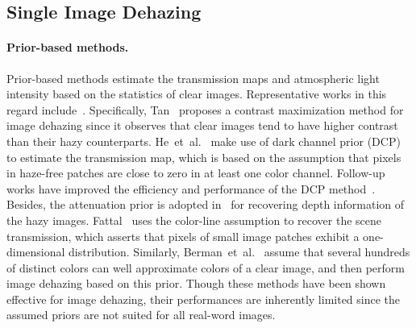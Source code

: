 \documentclass[10pt,twocolumn,letterpaper]{article}
\def\etal{et~al.\xspace}
\begin{document}
\subsection{Single Image Dehazing}
\paragraph{Prior-based methods.}
Prior-based methods estimate the transmission maps and atmospheric light intensity based on the statistics of clear images.
Representative works in this regard include~\cite{tan2008visibility,He2011Single,zhu2015fast,fattal2014dehazing,berman2016non}.
Specifically, Tan~\cite{tan2008visibility} proposes a contrast maximization method for image dehazing since it observes that clear images tend to have higher contrast than their hazy counterparts. 
He~\etal~\cite{He2011Single} make use of dark channel prior (DCP) to estimate the transmission map, which is based on the assumption that pixels in haze-free patches are close to zero in at least one color channel.
Follow-up works have improved the efficiency and performance of the DCP method~\cite{tarel2009fast, meng2013efficient, li2015nighttime, nishino2012bayesian, Yang_2018_ECCV}.
Besides, the attenuation prior is adopted in~\cite{zhu2015fast} for recovering depth information of the hazy images. 
Fattal~\cite{fattal2014dehazing} uses the color-line assumption to recover the scene transmission, which asserts that pixels of small image patches exhibit
a one-dimensional distribution.
Similarly, Berman~\etal~\cite{berman2016non} assume that several hundreds of distinct colors can well approximate colors of a clear image, and then perform image dehazing based on this prior.
Though these methods have been shown effective for image dehazing, their performances are inherently limited since the assumed priors are not suited for all real-word images.
\vspace{-4mm}
\end{document}
